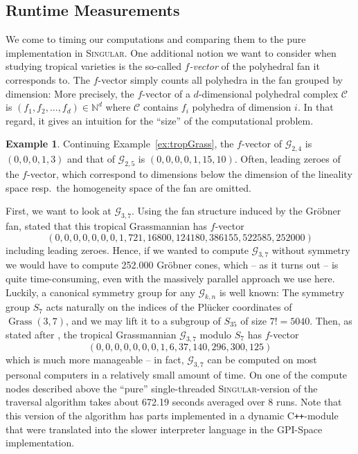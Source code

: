 \documentclass[
  paper=a4,
  titlepage,
  bibliography=totoc,
  pagesize=pdftex
]{scrartcl}
\numberwithin{figure}{section}
\numberwithin{equation}{section}
\numberwithin{table}{section}
\newcommand*\setN{\mathds{N}}
\newcommand{\Cpp}{C\nolinebreak\texttt{++}}
\DeclareMathOperator{\Grass}{Grass}
\theoremstyle{definition}
\newtheorem{example}[definition]{Example}
\numberwithin{definition}{section}
\begin{document}
\subsection{Runtime Measurements}

We come to timing our computations and comparing them to the pure implementation in
\textsc{Singular}. One additional notion we want to consider when studying tropical
varieties is the so-called \emph{$f$-vector} of the polyhedral fan it corresponds to. The
$f$-vector simply counts all polyhedra in the fan grouped by dimension: More precisely,
the $f$-vector of a $d$-dimensional polyhedral complex $\mathcal C$ is $(f_1, f_2, \dots,
f_d) \in \setN^d$ where $\mathcal C$ contains $f_i$ polyhedra of dimension $i$. In that
regard, it gives an intuition for the \enquote{size} of the computational problem.

\begin{example} \label{ex:fVec}
  Continuing Example~\ref{ex:tropGrass}, the $f$-vector of $\mathcal G_{2,4}$ is
  $(0,0,0,1,3)$ and that of $\mathcal G_{2,5}$ is $(0,0,0,0,1,15,10)$. Often, leading
  zeroes of the $f$-vector, which correspond to dimensions below the dimension of the
  lineality space resp.\ the homogeneity space of the fan are omitted.
\end{example}

First, we want to look at $\mathcal G_{3,7}$. Using the fan structure induced by the
Gröbner fan, \cite[Theorem~2.1]{tropPlane} stated that this tropical Grassmannian has
$f$-vector
\[
  (0,0,0,0,0,0,0,1,721,16800,124180,386155,522585,252000)
\]
including leading zeroes. Hence, if we wanted to compute $\mathcal G_{3,7}$ without
symmetry we would have to compute 252.000 Gröbner cones, which -- as it turns out -- is
quite time-consuming, even with the massively parallel approach we use here. Luckily, a
canonical symmetry group for any $\mathcal G_{k,n}$ is well known: The symmetry group
$S_7$ acts naturally on the indices of the Plücker coordinates of $\Grass(3,7)$, and we
may lift it to a subgroup of $S_{35}$ of size $7! = 5040$. Then, as stated after
\cite[Theorem~2.2]{tropPlane}, the tropical Grassmannian $\mathcal G_{3,7}$ modulo $S_7$
has $f$-vector
\[
  (0,0,0,0,0,0,0,1,6,37,140,296,300,125)
\]
which is much more manageable -- in fact, $\mathcal G_{3,7}$ can be computed on most
personal computers in a relatively small amount of time. On one of the compute nodes
described above the \enquote{pure} single-threaded \textsc{Singular}-version of the
traversal algorithm takes about {672.19} seconds averaged over 8 runs. Note that this
version of the algorithm has parts implemented in a dynamic \Cpp-module that were
translated into the slower  interpreter language in the GPI-Space
implementation.
\end{document}
